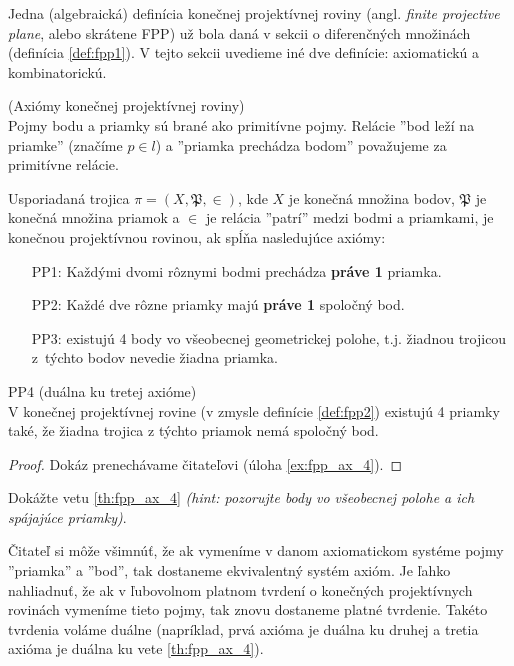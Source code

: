 Jedna (algebraická) definícia konečnej projektívnej roviny (angl. \emph{finite projective plane}, alebo skrátene FPP) 
už bola daná v sekcii o diferenčných množinách (definícia \ref{def:fpp1}). V tejto sekcii uvedieme iné dve definície: 
axiomatickú a kombinatorickú.


\begin{definition}{(Axiómy konečnej projektívnej roviny)}\\
\label{def:fpp2}
Pojmy bodu a priamky sú brané ako primitívne pojmy. 
Relácie ''bod leží na priamke'' (značíme $p \in l$) a ''priamka prechádza bodom'' považujeme za primitívne relácie.

Usporiadaná trojica $\pi = (X, \mathfrak{P}, \in)$, kde $X$ je konečná množina bodov, $\mathfrak{P}$ je konečná množina priamok a $\in$ je relácia ''patrí'' medzi bodmi a priamkami, je konečnou projektívnou rovinou, ak spĺňa nasledujúce axiómy:
\begin{enumerate}
    \item[PP1:] Každými dvomi rôznymi bodmi prechádza \textbf{práve 1} priamka.
    \item[PP2:] Každé dve rôzne priamky majú \textbf{práve 1} spoločný bod.
    \item[PP3:] existujú 4 body vo všeobecnej geometrickej polohe, t.j. žiadnou trojicou
    z~týchto bodov nevedie žiadna priamka.
\end{enumerate}
\end{definition}

\begin{theorem}{PP4 (duálna ku tretej axióme)}\\
\label{th:fpp_ax_4}
V konečnej projektívnej rovine (v zmysle definície \ref{def:fpp2}) existujú 4 priamky také,
že žiadna trojica z týchto priamok nemá spoločný bod.
\end{theorem}
\begin{proof}
Dokáz prenechávame čitateľovi (úloha \ref{ex:fpp_ax_4}).
\end{proof}

\begin{exercise}
\label{ex:fpp_ax_4}
Dokážte vetu \ref{th:fpp_ax_4} \emph{(hint: pozorujte body vo všeobecnej polohe a ich spájajúce priamky)}.
\end{exercise}

Čitateľ si môže všimnúť, že ak vymeníme v danom axiomatickom systéme pojmy ''priamka'' a ''bod'', tak dostaneme ekvivalentný systém axióm. 
Je ľahko nahliadnuť, že ak v ľubovolnom platnom tvrdení o konečných projektívnych rovinách vymeníme tieto pojmy, tak znovu dostaneme platné tvrdenie.
Takéto tvrdenia voláme duálne (napríklad, prvá axióma je duálna ku druhej a tretia axióma
je duálna ku vete \ref{th:fpp_ax_4}).


